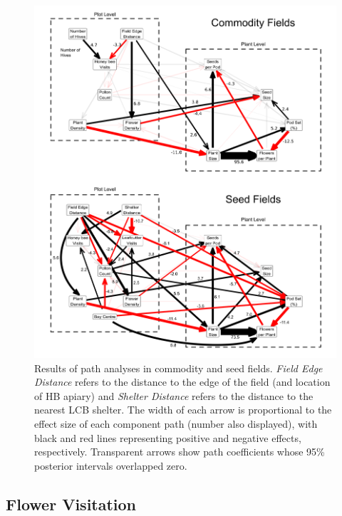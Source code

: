 \documentclass[12pt]{article} %
\begin{document}
\begin{figure}
    \centering
    \includegraphics[width=\textwidth,keepaspectratio=true]{../Figures/allSEM.png}
    \caption{Results of path analyses in commodity and seed fields. \emph{Field Edge Distance} refers to the distance to the edge of the field (and location of HB apiary) and \emph{Shelter Distance} refers to the distance to the nearest LCB shelter. The width of each arrow is proportional to the effect size of each component path (number also displayed), with black and red lines representing positive and negative effects, respectively. Transparent arrows show path coefficients whose 95\% posterior intervals overlapped zero.}
    \label{fig:allSEM}
\end{figure}


\subsection*{Flower Visitation}
\end{document}
